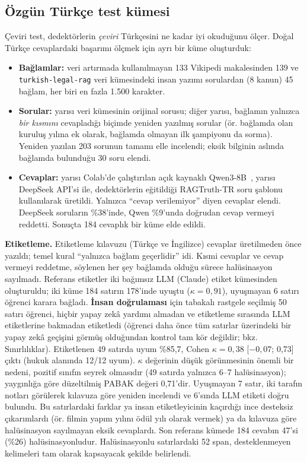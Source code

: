 \documentclass[conference,a4paper]{IEEEtran}
\begin{document}
\subsection{Özgün Türkçe test kümesi}
Çeviri test, dedektörlerin \emph{çeviri} Türkçesini ne kadar iyi okuduğunu ölçer. Doğal Türkçe cevaplardaki başarımı ölçmek için ayrı bir küme oluşturduk:
\begin{itemize}
\item \textbf{Bağlamlar:} veri artırmada kullanılmayan 133 Vikipedi makalesinden 139 ve \texttt{turkish-legal-rag} veri kümesindeki insan yazımı sorulardan (8 kanun) 45 bağlam, her biri en fazla 1.500 karakter.
\item \textbf{Sorular:} yarısı veri kümesinin orijinal sorusu; diğer yarısı, bağlamın yalnızca \emph{bir kısmını} cevapladığı biçimde yeniden yazılmış sorular (ör. bağlamda olan kuruluş yılına ek olarak, bağlamda olmayan ilk şampiyonu da sorma). Yeniden yazılan 203 sorunun tamamı elle incelendi; eksik bilginin aslında bağlamda bulunduğu 30 soru elendi.
\item \textbf{Cevaplar:} yarısı Colab'de çalıştırılan açık kaynaklı Qwen3-8B~\cite{yang2025qwen3}, yarısı DeepSeek API'si ile, dedektörlerin eğitildiği RAGTruth-TR soru şablonu kullanılarak üretildi. Yalnızca ``cevap verilemiyor'' diyen cevaplar elendi. DeepSeek soruların \%38'inde, Qwen \%9'unda doğrudan cevap vermeyi reddetti. Sonuçta 184 cevaplık bir küme elde edildi.
\end{itemize}

\textbf{Etiketleme.} Etiketleme kılavuzu (Türkçe ve İngilizce) cevaplar üretilmeden önce yazıldı; temel kural ``yalnızca bağlam geçerlidir'' idi. Kısmi cevaplar ve cevap vermeyi reddetme, söylenen her şey bağlamda olduğu sürece halüsinasyon sayılmadı. Referans etiketler iki bağımsız LLM (Claude) etiket kümesinden oluşturuldu; iki küme 184 satırın 178'inde uyuştu ($\kappa = 0{,}91$), uyuşmayan 6 satırı öğrenci karara bağladı. \textbf{İnsan doğrulaması} için tabakalı rastgele seçilmiş 50 satırı öğrenci, hiçbir yapay zekâ yardımı almadan ve etiketleme sırasında LLM etiketlerine bakmadan etiketledi (öğrenci daha önce tüm satırlar üzerindeki bir yapay zekâ geçişini görmüş olduğundan kontrol tam kör değildir; bkz. Sınırlılıklar). Etiketlenen 49 satırda uyum \%85{,}7, Cohen $\kappa = 0{,}38$ [$-0{,}07$; 0{,}73] çıktı (hukuk alanında 12/12 uyum). $\kappa$ değerinin düşük görünmesinin önemli bir nedeni, pozitif sınıfın seyrek olmasıdır (49 satırda yalnızca 6--7 halüsinasyon); yaygınlığa göre düzeltilmiş PABAK değeri 0{,}71'dir. Uyuşmayan 7 satır, iki tarafın notları görülerek kılavuza göre yeniden incelendi ve 6'sında LLM etiketi doğru bulundu. Bu satırlardaki farklar ya insan etiketleyicinin kaçırdığı ince desteksiz çıkarımlardı (ör. filmin yapım yılını ödül yılı olarak vermek) ya da kılavuza göre halüsinasyon sayılmayan eksik cevaplardı. Son referans kümede 184 cevabın 47'si (\%26) halüsinasyonludur. Halüsinasyonlu satırlardaki 52 span, desteklenmeyen kelimeleri tam olarak kapsayacak şekilde belirlendi.
\end{document}
